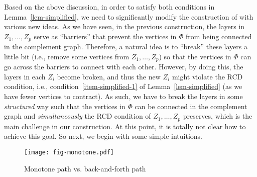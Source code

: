 \documentclass[a4paper,11pt]{article}
\numberwithin{lemma}{section}
\begin{document}
Based on the above discussion, in order to satisfy both conditions in Lemma~\ref{lem-simplified}, we need to significantly modify the construction of \cite{BandyapadhyayLLSJ22} with various new ideas.
As we have seen, in the previous construction, the layers in $Z_1,\dots,Z_p$ serve as ``barriers'' that prevent the vertices in $\varPhi$ from being connected in the complement graph.
Therefore, a natural idea is to ``break'' these layers a little bit (i.e., remove some vertices from $Z_1,\dots,Z_p$) so that the vertices in $\varPhi$ can go across the barriers to connect with each other.
However, by doing this, the layers in each $Z_i$ become broken, and thus the new $Z_i$ might violate the RCD condition, i.e., condition~\ref{item-simplified-1} of Lemma~\ref{lem-simplified} (as we have fewer vertices to contract).
As such, we have to break the layers in some \emph{structured} way such that the vertices in $\varPhi$ can be connected in the complement graph and \emph{simultaneously} the RCD condition of $Z_1,\dots,Z_p$ preserves, which is the main challenge in our construction.
At this point, it is totally not clear how to achieve this goal.
So next, we begin with some simple intuitions.

\begin{figure}
 \centering
 \texttt{[image: fig-monotone.pdf]}
 \caption{Monotone path vs. back-and-forth path}
 \label{fig-mono}
\end{figure}
\end{document}
